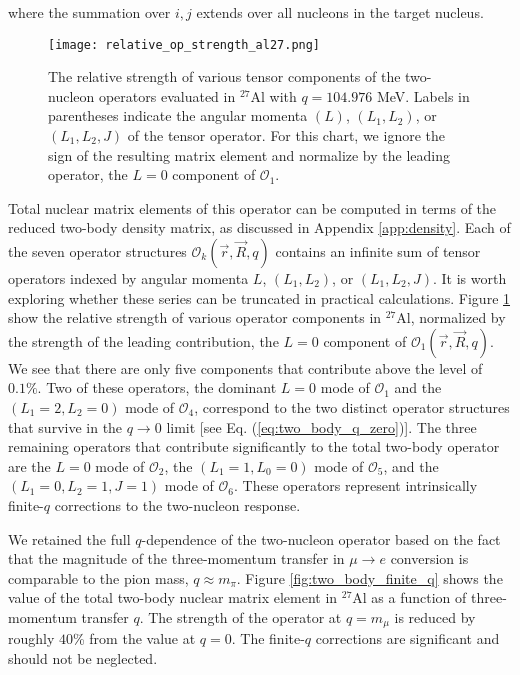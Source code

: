 \documentclass{book}[letterpaper,12pt]
\begin{document}
where the summation over $i,j$ extends over all nucleons in the target nucleus.
\begin{figure}
\centering
\texttt{[image: relative\_op\_strength\_al27.png]}
\caption{The relative strength of various tensor components of the two-nucleon operators evaluated in $^{27}$Al with $q = 104.976$ MeV. Labels in parentheses indicate the angular momenta $(L)$, $(L_1, L_2)$, or $(L_1, L_2, J)$ of the tensor operator. For this chart, we ignore the sign of the resulting matrix element and normalize by the leading operator, the $L=0$ component of $\mathcal{O}_1$.}
\label{fig:rel_op_str}
\end{figure}
Total nuclear matrix elements of this operator can be computed in terms of the reduced two-body density matrix, as discussed in Appendix \ref{app:density}. Each of the seven operator structures $\mathcal{O}_k(\vec{r},\vec{R},q)$ contains an infinite sum of tensor operators indexed by angular momenta $L$, $(L_1,L_2)$, or $(L_1,L_2,J)$. It is worth exploring whether these series can be truncated in practical calculations. Figure \ref{fig:rel_op_str} show the relative strength of various operator components in $^{27}$Al, normalized by the strength of the leading contribution, the $L=0$ component of $\mathcal{O}_1(\vec{r},\vec{R},q)$. We see that there are only five components that contribute above the level of $0.1\%$. Two of these operators, the dominant $L=0$ mode of $\mathcal{O}_1$ and the $(L_1=2,L_2=0)$ mode of $\mathcal{O}_4$, correspond to the two distinct operator structures that survive in the $q\rightarrow 0$ limit [see Eq. (\ref{eq:two_body_q_zero})]. The three remaining operators that contribute significantly to the total two-body operator are the $L=0$ mode of $\mathcal{O}_2$, the $(L_1=1,L_0=0)$ mode of $\mathcal{O}_5$, and the $(L_1=0,L_2=1,J=1)$ mode of $\mathcal{O}_6$. These operators represent intrinsically finite-$q$ corrections to the two-nucleon response.

We retained the full $q$-dependence of the two-nucleon operator based on the fact that the magnitude of the three-momentum transfer in $\mu\rightarrow e$ conversion is comparable to the pion mass, $q\approx m_{\pi}$. Figure \ref{fig:two_body_finite_q} shows the value of the total two-body nuclear matrix element in $^{27}$Al as a function of three-momentum transfer $q$. The strength of the operator at $q=m_{\mu}$ is reduced by roughly $40$\% from the value at $q=0$. The finite-$q$ corrections are significant and should not be neglected.
\end{document}
